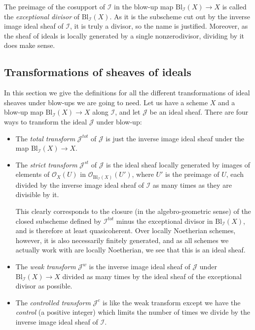 \documentclass[12pt,a4paper,leqno]{article}
\newcommand{\OO}{\mathcal{O}}
\newcommand{\bl}{\mathrm{Bl}}
\theoremstyle{plain}
\theoremstyle{definition}
\theoremstyle{remark}
\begin{document}
The preimage of the cosupport of $\mathscr{I}$ in the blow-up map $\bl_{\mathscr{I}} (X) \to X$ is called the \emph{exceptional divisor} of $\bl_{\mathscr{I}} (X)$. As it is the subscheme cut out by the inverse image ideal sheaf of $\mathscr{I}$, it is truly a divisor, so the name is justified. Moreover, as the sheaf of ideals is locally generated by a single nonzerodivisor, dividing by it does make sense. 

\subsection{Transformations of sheaves of ideals}

In this section we give the definitions for all the different transformations of ideal sheaves under blow-ups we are going to need. Let us have a scheme $X$ and a blow-up map $\bl_{\mathscr{I}}(X) \to X$ along $\mathscr{I}$, and let $\mathscr{J}$ be an ideal sheaf. There are four ways to transform the ideal $\mathscr{J}$ under blow-up:

\begin{itemize}
\item The \emph{total transform} $\mathscr{J}^{tot}$ of $\mathscr{J}$ is just the inverse image ideal sheaf under the map $\bl_{\mathscr{I}}(X) \to X$.

\item The \emph{strict transform} $\mathscr{J}^{st}$ of $\mathscr{J}$ is the ideal sheaf locally generated by images of elements of $\OO_X (U)$ in $\OO_{\bl_{\mathscr{I}}(X)}(U')$, where $U'$ is the preimage of $U$, each divided by the inverse image ideal sheaf of $\mathscr{I}$ as many times as they are divisible by it.

This clearly corresponds to the closure (in the algebro-geometric sense) of the closed subscheme defined by $\mathscr{I}^{tot}$ minus the exceptional divisor in $\bl_{\mathscr{I}} (X)$, and is therefore at least quasicoherent. Over locally Noetherian schemes, however, it is also necessarily finitely generated, and as all schemes we actually work with are locally Noetherian, we see that this is an ideal sheaf.

\item The \emph{weak transform} $\mathscr{J}^{w}$ is the inverse image ideal sheaf of $\mathscr{J}$ under $\bl_{\mathscr{I}}(X) \to X$ divided as many times by the ideal sheaf of the exceptional divisor as possible.

\item The \emph{controlled transform} $\mathscr{J}^{c}$ is like the weak transform except we have the \emph{control} (a positive integer) which limits the number of times we divide by the inverse image ideal sheaf of $\mathscr{I}$.
\end{itemize}
\end{document}
